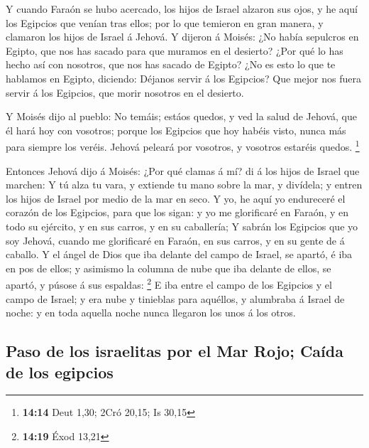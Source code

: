  Y cuando Faraón se hubo acercado, los hijos de Israel
alzaron sus ojos, y he aquí los Egipcios que venían tras ellos; por lo
que temieron en gran manera, y clamaron los hijos de Israel á Jehová.
 Y dijeron á Moisés: ¿No había sepulcros en Egipto, que nos
has sacado para que muramos en el desierto? ¿Por qué lo has hecho así
con nosotros, que nos has sacado de Egipto?  ¿No es esto lo
que te hablamos en Egipto, diciendo: Déjanos servir á los Egipcios? Que
mejor nos fuera servir á los Egipcios, que morir nosotros en el
desierto.

 Y Moisés dijo al pueblo: No temáis; estáos quedos, y ved
la salud de Jehová, que él hará hoy con vosotros; porque los Egipcios
que hoy habéis visto, nunca más para siempre los veréis. 
Jehová peleará por vosotros, y vosotros estaréis quedos. \footnote{\textbf{14:14}
  Deut 1,30; 2Cró 20,15; Is 30,15}

 Entonces Jehová dijo á Moisés: ¿Por qué clamas á mí? di á
los hijos de Israel que marchen:  Y tú alza tu vara, y
extiende tu mano sobre la mar, y divídela; y entren los hijos de Israel
por medio de la mar en seco.  Y yo, he aquí yo endureceré
el corazón de los Egipcios, para que los sigan: y yo me glorificaré en
Faraón, y en todo su ejército, y en sus carros, y en su caballería;
 Y sabrán los Egipcios que yo soy Jehová, cuando me
glorificaré en Faraón, en sus carros, y en su gente de á caballo.
 Y el ángel de Dios que iba delante del campo de Israel, se
apartó, é iba en pos de ellos; y asimismo la columna de nube que iba
delante de ellos, se apartó, y púsose á sus espaldas: \footnote{\textbf{14:19}
  Éxod 13,21}  E iba entre el campo de los Egipcios y el
campo de Israel; y era nube y tinieblas para aquéllos, y alumbraba á
Israel de noche: y en toda aquella noche nunca llegaron los unos á los
otros.

\hypertarget{paso-de-los-israelitas-por-el-mar-rojo-cauxedda-de-los-egipcios}{%
\subsection{Paso de los israelitas por el Mar Rojo; Caída de los
egipcios}\label{paso-de-los-israelitas-por-el-mar-rojo-cauxedda-de-los-egipcios}}

